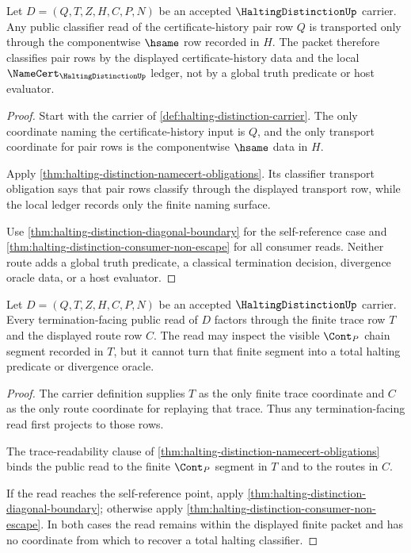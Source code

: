 \begin{theorem}
\label{thm:halting-distinction-pair-classifier-transport}
Let $D=(Q,T,Z,H,C,P,N)$ be an accepted $\HaltingDistinctionUp$ carrier. Any
public classifier read of the certificate-history pair row $Q$ is transported
only through the componentwise $\hsame$ row recorded in $H$. The packet
therefore classifies pair rows by the displayed certificate-history data and
the local $\NameCert_{\HaltingDistinctionUp}$ ledger, not by a global truth
predicate or host evaluator.
\end{theorem}
\begin{proof}
Start with the carrier of \autoref{def:halting-distinction-carrier}. The only
coordinate naming the certificate-history input is $Q$, and the only transport
coordinate for pair rows is the componentwise $\hsame$ data in $H$.

Apply \autoref{thm:halting-distinction-namecert-obligations}. Its classifier
transport obligation says that pair rows classify through the displayed
transport row, while the local ledger records only the finite naming surface.

Use \autoref{thm:halting-distinction-diagonal-boundary} for the self-reference
case and \autoref{thm:halting-distinction-consumer-non-escape} for all
consumer reads. Neither route adds a global truth predicate, a classical
termination decision, divergence oracle data, or a host evaluator.
\end{proof}

\begin{theorem}
\label{thm:halting-distinction-trace-readability}
Let $D=(Q,T,Z,H,C,P,N)$ be an accepted $\HaltingDistinctionUp$ carrier. Every
termination-facing public read of $D$ factors through the finite trace row $T$
and the displayed route row $C$. The read may inspect the visible
$\Cont_P$ chain segment recorded in $T$, but it cannot turn that finite
segment into a total halting predicate or divergence oracle.
\end{theorem}
\begin{proof}
The carrier definition supplies $T$ as the only finite trace coordinate and
$C$ as the only route coordinate for replaying that trace. Thus any
termination-facing read first projects to those rows.

The trace-readability clause of
\autoref{thm:halting-distinction-namecert-obligations} binds the public read
to the finite $\Cont_P$ segment in $T$ and to the routes in $C$.

If the read reaches the self-reference point, apply
\autoref{thm:halting-distinction-diagonal-boundary}; otherwise apply
\autoref{thm:halting-distinction-consumer-non-escape}. In both cases the read
remains within the displayed finite packet and has no coordinate from which to
recover a total halting classifier.
\end{proof}

